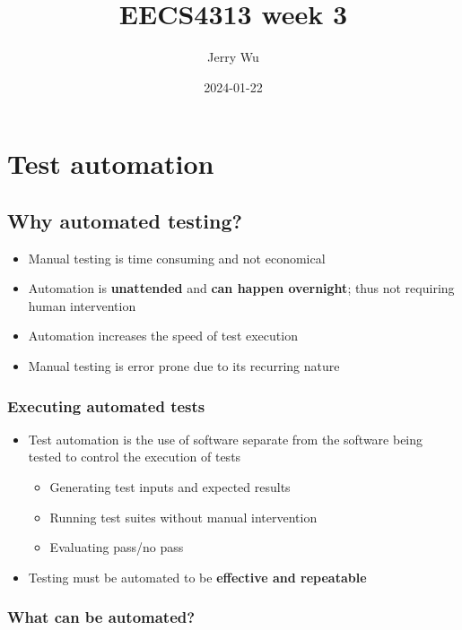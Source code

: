 \documentclass[12pt]{book}
\title{EECS4313 week 3}
\author{Jerry Wu}
\date{2024-01-22}
\begin{document}
\maketitle
\tableofcontents

\chapter{Test automation}

\section*{Why automated testing?}

\begin{itemize}
    \item Manual testing is time consuming and not economical
    \item Automation is \textbf{unattended} and \textbf{can happen overnight}; thus not requiring human intervention
    \item Automation increases the speed of test execution
    \item Manual testing is error prone due to its recurring nature
\end{itemize}

\subsection*{Executing automated tests}

\begin{itemize}
    \item Test automation is the use of software separate from the software being tested to control the execution of tests
    \begin{itemize}
        \item Generating test inputs and expected results
        \item Running test suites without manual intervention
        \item Evaluating pass/no pass
    \end{itemize}

    \item Testing must be automated to be \textbf{effective and repeatable}
\end{itemize}


\subsection*{What can be automated?}
\end{document}
